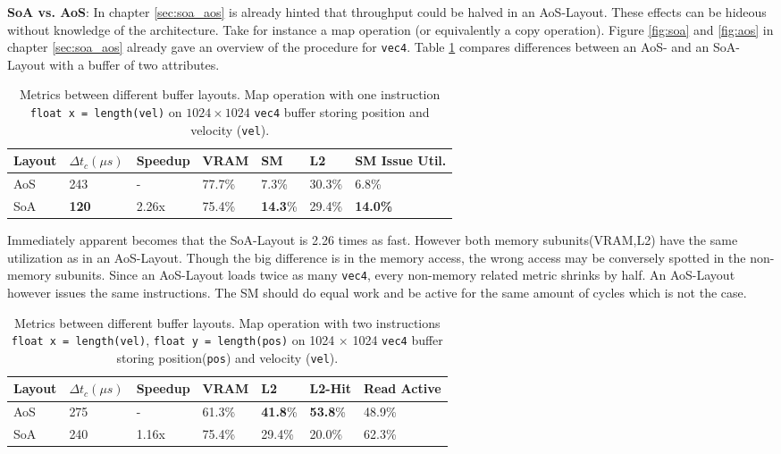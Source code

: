 \documentclass[m,times]{cgMA}
\begin{document}
\textbf{SoA vs. AoS}: In chapter \ref{sec:soa_aos} is already hinted that throughput could be halved in an AoS-Layout. These effects can be hideous without knowledge of the architecture. Take for instance a map operation (or equivalently a copy operation). Figure \ref{fig:soa} and \ref{fig:aos} in chapter \ref{sec:soa_aos} already gave an overview of the procedure for \texttt{vec4}. Table \ref{tab:map_1} compares differences between an AoS- and an SoA-Layout with a buffer of two attributes.
\begin{table}[htbp]
  \begin{tabular}{ | l | l | l | l | l | l | l |}    \hline
    Layout &  $\Delta t_c (\mu s)$	& Speedup &VRAM     & SM     & L2     & SM Issue Util. \\\hline
    AoS         & 243                   & -       &77.7\%   & 7.3\%  & 30.3\% & 6.8\% \\\hline
    SoA         & \textbf{120}                   & 2.26x   &75.4\%   & \textbf{14.3}\% & 29.4\% & \textbf{14.0\%} \\
    \hline
  \end{tabular}
\caption{Metrics between different buffer layouts. Map operation with one instruction \texttt{float x = length(vel)} on $1024 \times 1024$ \texttt{vec4} buffer storing position and velocity (\texttt{vel}).}
\label{tab:map_1}
\end{table}

Immediately apparent becomes that the SoA-Layout is 2.26 times as fast. However both memory subunits(VRAM,L2) have the same utilization as in an AoS-Layout. Though the big difference is in the memory access, the wrong access may be conversely spotted in the non-memory subunits. Since an AoS-Layout loads twice as many \texttt{vec4}, every non-memory related metric shrinks by half. An AoS-Layout however issues the same instructions. The SM should do equal work and be active for the same amount of cycles which is not the case.
\begin{table}[htpb]
  \begin{tabular}{ | l | l | l | l | l | l | l |}    \hline
    Layout &  $\Delta t_c (\mu s)$ & Speedup       &VRAM             & L2              & L2-Hit & Read Active \\\hline
    AoS         & 275                   & -        &61.3\%           & \textbf{41.8}\% & \textbf{53.8}\% & 48.9\% \\\hline
    SoA         & 240                   & 1.16x    &75.4\%  & 29.4\%          & 20.0\% & 62.3\% \\
    \hline
  \end{tabular}
\caption{Metrics between different buffer layouts. Map operation with two instructions \texttt{float x = length(vel)}, \texttt{float y = length}\texttt{(pos)} on 1024 $\times$ 1024 \texttt{vec4} buffer storing position(\texttt{pos}) and velocity (\texttt{vel}).}
\label{tab:map_2}
\end{table}
\end{document}
